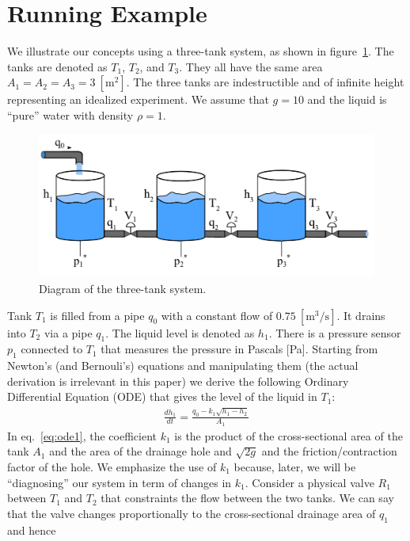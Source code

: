\section{Running Example}
%
We illustrate our concepts using a three-tank system, as shown in figure~\ref{fig:three_tanks}. The
tanks are denoted as $T_1$, $T_2$, and $T_3$. They all have the same
area $A_1 = A_2 = A_3 = 3~[\textrm{m}^2]$. The three tanks are
indestructible and of infinite height representing an idealized
experiment.  We assume that $g = 10$ and the liquid is ``pure'' water
with density $\rho = 1$.
%
\begin{figure}[htb]
  \centering
  \includegraphics[width=1\columnwidth]{3-tanks}
  \caption{Diagram of the three-tank system.}
  \label{fig:three_tanks}
\end{figure}
\par\noindent
%
Tank $T_1$ is filled from a pipe $q_0$ with a constant flow of
$0.75~[\textrm{m}^3/\textrm{s}]$. It drains into $T_2$ via a pipe
$q_1$. The liquid level is denoted as $h_1$. There is a pressure
sensor $p_1$ connected to $T_1$ that measures the pressure in Pascals
[Pa]. Starting from Newton's (and Bernouli's) equations and
manipulating them (the actual derivation is irrelevant in this paper)
we derive the following Ordinary Differential Equation (ODE) that
gives the level of the liquid in $T_1$:
%
\begin{eqnarray}
%
\frac{d h_1}{dt} = \frac{q_0 - k_1 \sqrt{h_1 - h_2}}{A_1}\label{eq:ode1}
%
\end{eqnarray}
%
In eq.~\ref{eq:ode1}, the coefficient $k_1$ is the product of the
cross-sectional area of the tank $A_1$ and the area of the drainage
hole and $\sqrt{2g}$ and the friction/contraction factor of the
hole. We emphasize the use of $k_1$ because, later, we will be
``diagnosing'' our system in term of changes in $k_1$. Consider a
physical valve $R_1$ between $T_1$ and $T_2$ that constraints the flow
between the two tanks. We can say that the valve changes
proportionally to the cross-sectional drainage area of $q_1$ and hence
